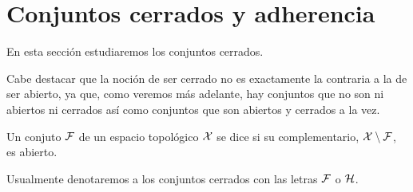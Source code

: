 \section{Conjuntos cerrados y adherencia}
\label{etop_cerradosAdherencia}
En esta sección estudiaremos los conjuntos cerrados.

Cabe destacar que la noción de ser cerrado no es exactamente la contraria a la de ser abierto, ya que, como veremos más adelante, hay conjuntos que no son ni abiertos ni cerrados así como conjuntos que son abiertos y cerrados a la vez.

\begin{defi}
	Un conjuto $\mathcal{F}$ de un espacio topológico $\mathcal{X}$ se dice  si su complementario, $\mathcal{X}\setminus\mathcal{F}$, es abierto.
\end{defi}

Usualmente denotaremos a los conjuntos cerrados con las letras $\mathcal{F}$ o $\mathcal{H}$.

